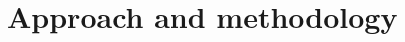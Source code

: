 \documentclass[a4paper]{article}
\begin{document}





\section{Approach and methodology}

\end{document}

